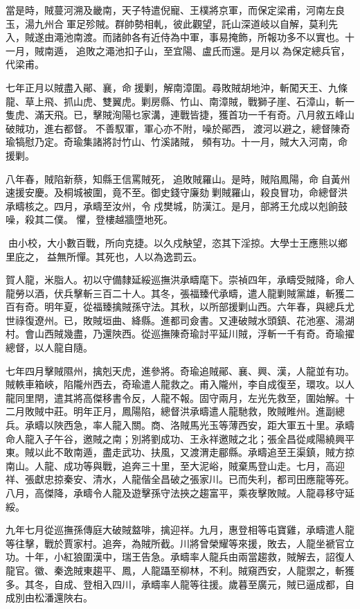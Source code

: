 \begin{pinyinscope}
當是時，賊蔓河溯及畿南，天子特遣倪寵、王樸將京軍，而保定梁甫，河南左良玉，湯九州合軍足殄賊。群帥勢相軋，彼此觀望，託山深道岐以自解，莫利先入，賊遂由澠池南渡。而諸帥各有近侍為中軍，事易掩飾，所報功多不以實也。十一月，賊南遁，追敗之澠池扣子山，至宜陽、盧氏而還。是月以為保定總兵官，代梁甫。

七年正月以賊盡入鄖、襄，命援剿，解南漳圍。尋敗賊胡地沖，斬闖天王、九條龍、草上飛、抓山虎、雙翼虎。剿房縣、竹山、南漳賊，戰獅子崖、石漳山，斬一隻虎、滿天飛。已，擊賊洵陽乜家溝，連戰皆捷，獲首功一千有奇。八月敘五峰山破賊功，進右都督。不善馭軍，軍心亦不附，噪於鄖西，渡河以避之，總督陳奇瑜犒慰乃定。奇瑜集諸將討竹山、竹溪諸賊，頻有功。十一月，賊大入河南，命援剿。

八年春，賊陷新蔡，知縣王信罵賊死，追敗賊羅山。是時，賊陷鳳陽，命自黃州速援安慶。及桐城被圍，竟不至。御史錢守廉劾剿賊羅山，殺良冒功，命總督洪承疇核之。四月，承疇至汝州，令戍樊城，防漢江。是月，部將王允成以剋餉鼓噪，殺其二僕。懼，登樓越牆墮地死。

由小校，大小數百戰，所向克捷。以久戍觖望，恣其下淫掠。大學士王應熊以鄉里庇之，益無所憚。其死也，人以為逸罰云。

賀人龍，米脂人。初以守備隸延綏巡撫洪承疇麾下。崇禎四年，承疇受賊降，命人龍勞以酒，伏兵擊斬三百二十人。其冬，張福臻代承疇，遣人龍剿賊黨雄，斬獲二百有奇。明年夏，從福臻擒賊孫守法。其秋，以所部援剿山西。六年春，與總兵尤世祿復遼州。已，敗賊垣曲、絳縣。進都司僉書。又連破賊水頭鎮、花池塞、湯湖村。會山西賊幾盡，乃還陜西。從巡撫陳奇瑜討平延川賊，浮斬一千有奇。奇瑜擢總督，以人龍自隨。

七年四月擊賊隰州，擒剋天虎，進參將。奇瑜追賊鄖、襄、興、漢，人龍並有功。賊軼車箱峽，陷隴州西去，奇瑜遣人龍救之。甫入隴州，李自成復至，環攻。以人龍同里閈，遣其將高傑移書令反，人龍不報。固守兩月，左光先救至，圍始解。十二月敗賊中莊。明年正月，鳳陽陷，總督洪承疇遣人龍馳救，敗賊睢州。進副總兵。承疇以陜西急，率人龍入關。商、洛賊馬光玉等薄西安，距大軍五十里。承疇命人龍入子午谷，邀賊之南；別將劉成功、王永祥邀賊之北；張全昌從咸陽繞興平東。賊以此不敢南遁，盡走武功、扶風，又渡渭走郿縣。承疇追至王渠鎮，賊方掠南山。人龍、成功等與戰，追奔三十里，至大泥峪，賊棄馬登山走。七月，高迎祥、張獻忠掠秦安、清水，人龍偕全昌破之張家川。已而失利，都司田應龍等死。八月，高傑降，承疇令人龍及遊擊孫守法挾之趨富平，乘夜擊敗賊。人龍尋移守延綏。

九年七月從巡撫孫傳庭大破賊盩啡，擒迎祥。九月，惠登相等屯寶雞，承疇遣人龍等往擊，戰於賈家村。追奔，為賊所截。川將曾榮耀等來援，敗去，人龍坐褫官立功。十年，小紅狼圍漢中，瑞王告急。承疇率人龍兵由兩當趨救，賊解去，詔復人龍官。徽、秦逸賊東趨平、鳳，人龍躡至柳林，不利。賊窺西安，人龍禦之，斬獲多。其冬，自成、登相入四川，承疇率人龍等往援。歲暮至廣元，賊已逼成都，自成別由松潘還陜右。


\end{pinyinscope}

